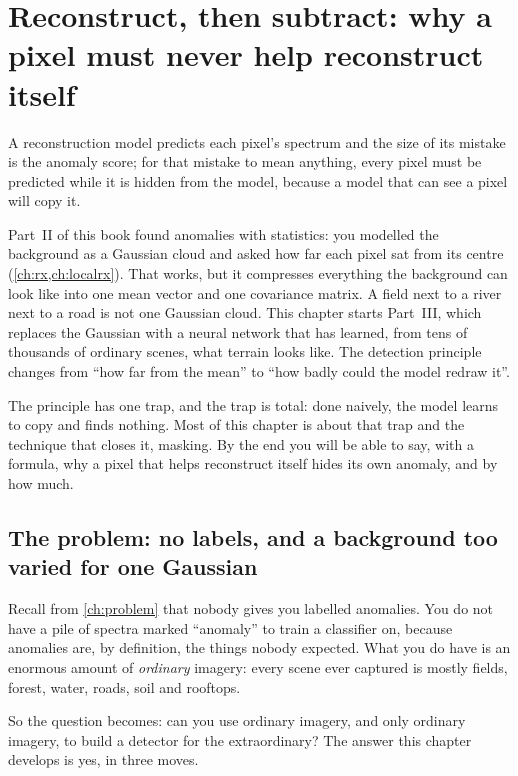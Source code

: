 \chapter{Reconstruct, then subtract: why a pixel must never help reconstruct itself}\label{ch:recon}

\begin{onething}
A reconstruction model predicts each pixel's spectrum and the size of its mistake is the anomaly score;
for that mistake to mean anything, every pixel must be predicted while it is hidden from the model,
because a model that can see a pixel will copy it.
\end{onething}

Part~II of this book found anomalies with statistics: you modelled the background as a Gaussian cloud
and asked how far each pixel sat from its centre (\cref{ch:rx,ch:localrx}). That works, but it compresses
everything the background can look like into one mean vector and one covariance matrix. A field next to
a river next to a road is not one Gaussian cloud. This chapter starts Part~III, which replaces the
Gaussian with a neural network that has learned, from tens of thousands of ordinary scenes, what terrain
looks like. The detection principle changes from ``how far from the mean'' to ``how badly could the
model redraw it''.

The principle has one trap, and the trap is total: done naively, the model learns to copy and finds
nothing. Most of this chapter is about that trap and the technique that closes it, masking. By the end
you will be able to say, with a formula, why a pixel that helps reconstruct itself hides its own
anomaly, and by how much.

\section{The problem: no labels, and a background too varied for one Gaussian}\label{sec:recon:problem}

Recall from \cref{ch:problem} that nobody gives you labelled anomalies. You do not have a pile of
spectra marked ``anomaly'' to train a classifier on, because anomalies are, by definition, the things
nobody expected. What you do have is an enormous amount of \emph{ordinary} imagery: every scene ever
captured is mostly fields, forest, water, roads, soil and rooftops.

So the question becomes: can you use ordinary imagery, and only ordinary imagery, to build a detector
for the extraordinary? The answer this chapter develops is yes, in three moves.

